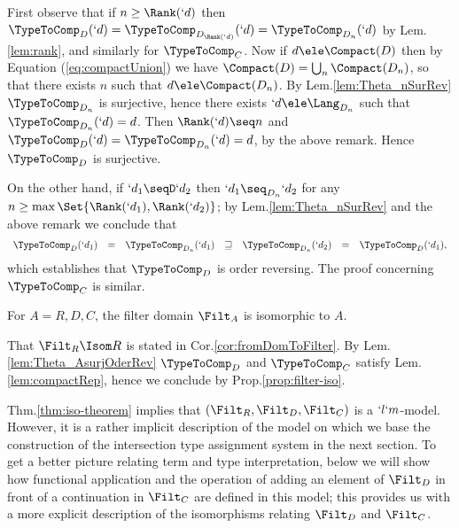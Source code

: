 \documentclass{CSML}
\begin{document}
 \begin{Proof}
First observe that if $n \geq \Rank(`d)$ then $\TypeToComp_D(`d) = \TypeToComp_{D_{\Rank(`d)}}(`d) = \TypeToComp_{D_n}(`d)$ 
by Lem.\skp\ref{lem:rank}, and similarly for $\TypeToComp_C$.
Now if $d\ele \Compact(D)$ then by Equation (\ref{eq:compactUnion}) we have $\Compact(D) = \bigcup_n \Compact(D_n)$, so that there exists $n$ such that $d \ele \Compact(D_n)$. By Lem.\skp\ref{lem:Theta_nSurRev} $\TypeToComp_{D_n}$ is surjective, hence there exists $`d \ele \Lang_{D_n}$ such that $\TypeToComp_{D_n}(`d) = d$. Then $\Rank(`d) \seq n$ and
$\TypeToComp_D(`d) = \TypeToComp_{D_n}(`d)= d$, by the above remark. Hence $\TypeToComp_D$ is surjective.

On the other hand, if $`d_1 \seqD `d_2$ then $`d_1 \seq_{D_n} `d_2$ for any $n \geq \max\Set{\Rank(`d_1),\Rank(`d_2)}$; by 
Lem.\skp\ref{lem:Theta_nSurRev} and the above remark we conclude that
%
 \[ \begin{array}{rcl@{\quad}lccc}
\TypeToComp_D(`d_1) &=& \TypeToComp_{D_n}(`d_1) &\sqsupseteq& \TypeToComp_{D_n}(`d_2) &=& \TypeToComp_D(`d_1),
 \end{array} \]
which establishes that $\TypeToComp_D$ is order reversing. 
The proof concerning $\TypeToComp_C$ is similar. ~%
 \end{Proof}


 \begin{thm} \label{thm:iso-theorem}
For $A = R,D,C$, the filter domain $\Filt_A$ is isomorphic to $A$.
 \end{thm}

 \begin{Proof}
That $\Filt_R \Isom R$ is stated in Cor.\skp\ref{cor:fromDomToFilter}. By Lem.\skp\ref{lem:Theta_AsurjOderRev}
 $\TypeToComp_D$ and $\TypeToComp_C$ satisfy Lem.\skp\ref{lem:compactRep}, hence we conclude by Prop.\skp\ref{prop:filter-iso}. ~%
 \end{Proof}

Thm.\skp\ref{thm:iso-theorem} implies that $(\Filt_R,\Filt_D,\Filt_C)$ is a $`l`m$-model. However, it is a rather implicit description of the model on which we base the construction of the intersection type assignment system in the next section. 
To get a better picture relating term and type interpretation, below we will show how functional application and the operation of adding an element of $\Filt_D$ in front of a continuation in $\Filt_C$ are defined in this model; this provides us with a more explicit description of the isomorphisms relating $\Filt_D$ and $\Filt_C$.
\end{document}
